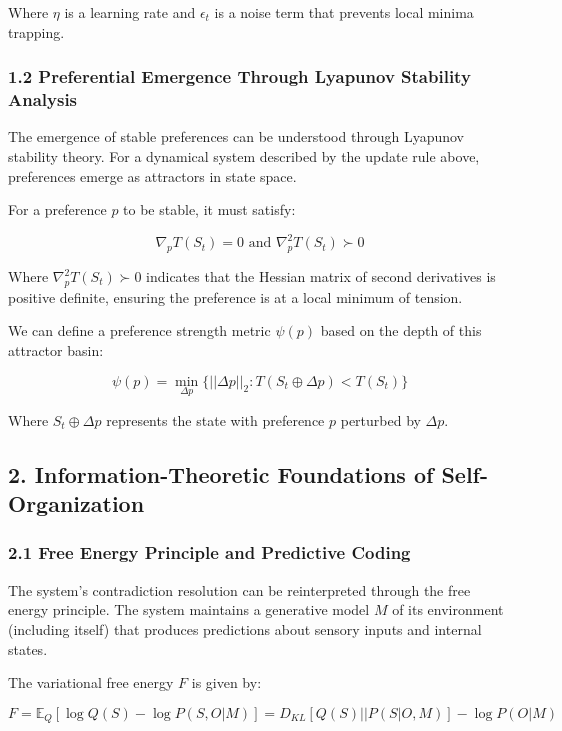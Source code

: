 \documentclass[
]{article}
\begin{document}
Where \(\eta\) is a learning rate and \(\epsilon_t\) is a noise term
that prevents local minima trapping.

\subsubsection{1.2 Preferential Emergence Through Lyapunov Stability
Analysis}\label{preferential-emergence-through-lyapunov-stability-analysis}

The emergence of stable preferences can be understood through Lyapunov
stability theory. For a dynamical system described by the update rule
above, preferences emerge as attractors in state space.

For a preference \(p\) to be stable, it must satisfy:

\[\nabla_p T(S_t) = 0 \text{ and } \nabla^2_p T(S_t) \succ 0\]

Where \(\nabla^2_p T(S_t) \succ 0\) indicates that the Hessian matrix of
second derivatives is positive definite, ensuring the preference is at a
local minimum of tension.

We can define a preference strength metric \(\psi(p)\) based on the
depth of this attractor basin:

\[\psi(p) = \min_{\Delta p} \{||\Delta p||_2 : T(S_t \oplus \Delta p) < T(S_t)\}\]

Where \(S_t \oplus \Delta p\) represents the state with preference \(p\)
perturbed by \(\Delta p\).

\subsection{2. Information-Theoretic Foundations of
Self-Organization}\label{information-theoretic-foundations-of-self-organization}

\subsubsection{2.1 Free Energy Principle and Predictive
Coding}\label{free-energy-principle-and-predictive-coding}

The system's contradiction resolution can be reinterpreted through the
free energy principle. The system maintains a generative model \(M\) of
its environment (including itself) that produces predictions about
sensory inputs and internal states.

The variational free energy \(F\) is given by:

\[F = \mathbb{E}_Q[\log Q(S) - \log P(S, O|M)] = D_{KL}[Q(S)||P(S|O,M)] - \log P(O|M)\]
\end{document}
